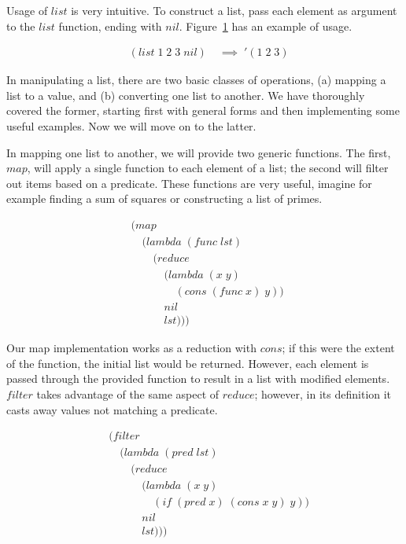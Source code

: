 Usage of $list$ is very intuitive. To construct a list, pass each element as
argument to the $list$ function, ending with $nil$.
Figure~\ref{fig:listExample} has an example of usage.   

\begin{figure}[htp]
\caption{}\label{fig:listExample}
\begin{align*}
& (list \; 1 \; 2 \; 3 \; nil) \; &\implies \; '(1 \; 2 \; 3)
\end{align*}
\end{figure}

In manipulating a list, there are two basic classes of operations, (a) mapping a 
list to a value, and (b) converting one list to another. We have thoroughly 
covered the former, starting first with general forms and then implementing some 
useful examples. Now we will move on to the latter.

In mapping one list to another, we will provide two generic functions. The first, 
$map$, will apply a single function to each element of a list; the second will 
filter out items based on a predicate. These functions are very useful, imagine 
for example finding a sum of squares or constructing a list of primes.

\begin{figure}[htp]
\caption{}\label{fig:mapDef}
\begin{align*}
& (map \; 
\\& \quad (lambda \; (func \; lst)
\\& \qquad (reduce
\\& \qquad \quad (lambda \; (x \; y) \; 
\\& \qquad \qquad (cons \; (func \; x) \; y)) \; 
\\& \qquad \quad nil
\\& \qquad \quad lst)))
\end{align*}
\end{figure}

Our map implementation works as a reduction with $cons$; if this were the extent 
of the function, the initial list would be returned. However, each element is 
passed through the provided function to result in a list with modified elements. 
$filter$ takes advantage of the same aspect of $reduce$; however, in its 
definition it casts away values not matching a predicate.

\begin{figure}[htp]
\caption{}\label{fig:filterDef}
\begin{align*}
& (filter \; 
\\& \quad (lambda \; (pred \; lst)
\\& \qquad (reduce
\\& \qquad \quad (lambda \; (x \; y)
\\& \qquad \qquad (if \; (pred \; x) \; (cons \; x \; y) \; y))
\\& \qquad \quad nil
\\& \qquad \quad lst)))
\end{align*}
\end{figure}

